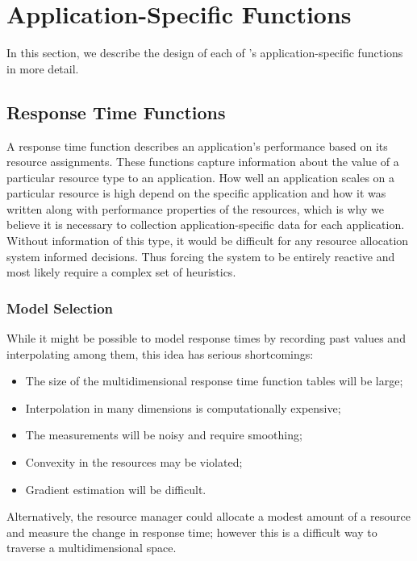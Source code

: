 \section{Application-Specific Functions}\label{app_func}


In this section, we describe the design of each of \pacora's application-specific functions in more detail.

\subsection*{Response Time Functions}

A response time function describes an application's performance based on its resource assignments.  These functions capture information about the value of a particular resource type to an application.  How well an application scales on a particular resource is high depend on the specific application and how it was written along with performance properties of the resources, which is why we believe it is necessary to collection application-specific data for each application. Without information of this type, it would be difficult for any resource allocation system informed decisions.  Thus forcing the system to be entirely reactive and most likely require a complex set of heuristics.  

\subsubsection*{Model Selection} While it might be possible to model response times by recording past values and interpolating among them, this idea has serious shortcomings:
\begin{itemize}
\item The size of the multidimensional response time function tables will be large;
\item Interpolation in many dimensions is computationally expensive;
\item The measurements will be noisy and require smoothing;
\item Convexity in the resources may be violated;
\item Gradient estimation will be difficult.
\end{itemize}
Alternatively, the resource manager could allocate a modest amount of a resource and measure the change in response time; however this is a difficult way to traverse a multidimensional space.

